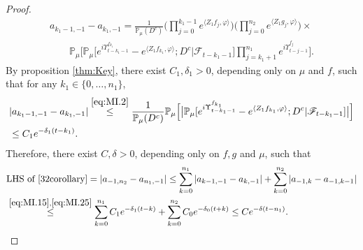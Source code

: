 \documentclass[12pt,a4paper]{amsart}
\theoremstyle{plain}
\theoremstyle{definition}
\numberwithin{equation}{section}
\begin{document}
\begin{proof}
\begin{equation}
	\label{eq:MI.2}
	\begin{multlined}
	a_{k_1-1,-1} - a_{k_1,-1}
	=  \frac{1}{\mathbb P_\mu(D^c)} \Big(\prod_{j=0}^{k_1-1}e^{\langle Z_1 f_j, \varphi\rangle}\Big) \Big(\prod_{j=0}^{n_2} e^{ \langle Z_1g_j,\varphi \rangle} \Big) \times {}
	\\ \qquad \mathbb{P}_{\mu}\Big[ \mathbb P_\mu\big[e^{i\Upsilon_{t-k_1-1}^{f_{k_1}}} -e^{\langle Z_1 f_{k_1}, \varphi\rangle}  ; D^c \big| \mathscr F_{t-k_1 - 1}\big] \prod_{j=k_1+1}^{n_1} e^{i\Upsilon_{t-j-1}^{f_j}} \Big] .
	\end{multlined}
\end{equation}
	By proposition \ref{thm:Key}, there exist $C_1,\delta_1 >0$, depending only on $\mu$ and $f$, such that for any $k_1 \in \{0,\dots,n_1\}$,
\begin{align}
    &| a_{k_1-1,-1} - a_{k_1,-1}|
    \overset{\eqref{eq:MI.2}}\leq \frac{1}{\mathbb{P}_{\mu}(D^c)}\mathbb{P}_{\mu}\Big[\big|\mathbb P_\mu[e^{i\Upsilon^{f_{k_1}}_{t-k_1-1}}-e^{\langle Z_1f_{k_1}, \varphi\rangle}; D^c|\mathscr F_{t-k_1-1}]\big|\Big]
    \\&\label{eq:MI.25} \leq C_1 e^{-\delta_1 (t-k_1)}.
\end{align}
  Therefore, there exist $C,\delta >0$, depending only on $f,g$ and $\mu$, such that
  \begin{align}
    &\text{LHS of \eqref{32corollary}}
    = \left|a_{-1,n_2}-a_{n_1,-1}\right|
      \leq \sum_{k=0}^{n_1}\left|a_{k-1,-1}-a_{k,-1}\right|+\sum_{k=0}^{n_2}\left|a_{-1,k}-a_{-1,k-1}\right|\\
     & \overset{\eqref{eq:MI.15},\eqref{eq:MI.25}}\leq \sum_{k=0}^{n_1} C_1 e^{-\delta_1 (t-k)}+\sum_{k=0}^{n_2} C_0 e^{-\delta_0 (t+k)}
      \leq C e^{- \delta (t-n_1)}.
      \qedhere
  \end{align}
\end{proof}
\end{document}
